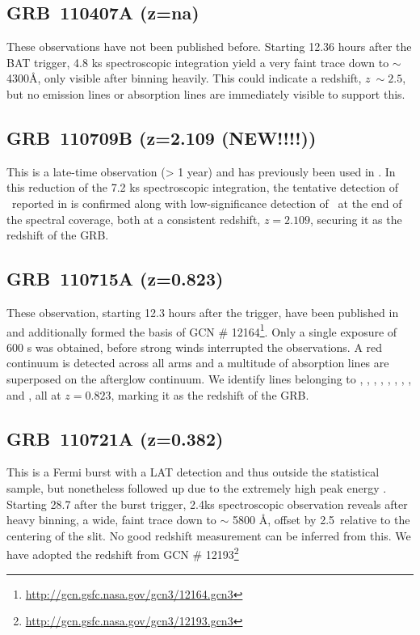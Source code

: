 \documentclass{aa}    %
\begin{document}
\subsection{GRB~110407A (z=na)} 

These observations have not been published before. Starting 12.36 hours after
the BAT trigger, 4.8 ks spectroscopic integration yield a very faint trace down
to $\sim$4300\AA, only visible after binning heavily. This could indicate a
redshift, $z ~\sim 2.5$, but no emission lines or absorption lines are
immediately visible to support this.

\subsection{GRB~110709B (z=2.109 (NEW!!!!))} 

This is a late-time observation (> 1 year) and has previously been used in
\citet{Perley2016a}. In this reduction of the 7.2 ks spectroscopic integration,
the tentative detection of \oiii~reported in \citet{Perley2016a} is confirmed
along with low-significance detection of \ha~at the end of the spectral
coverage, both at a consistent redshift, $z=2.109$, securing it as the redshift
of the GRB.


\subsection{GRB~110715A (z=0.823)}

These observation, starting 12.3 hours after the trigger, have been published in
\citet{Sanchez-Ramirez2017} and additionally formed the basis of GCN \#
12164\footnote{\url{http://gcn.gsfc.nasa.gov/gcn3/12164.gcn3}}. Only a single
exposure of 600 s was obtained, before strong winds interrupted the
observations. A red continuum is detected across all arms and a multitude of
absorption lines are superposed on the afterglow continuum. We identify lines
belonging to \alii, \aliii, \znii, \crii, \feii, \mgii, \mgi, \caii, and \caii,
all at  $z=0.823$, marking it as the redshift of the GRB.

\subsection{GRB~110721A (z=0.382)}

This is a Fermi burst with a LAT detection and thus outside the statistical
sample, but nonetheless followed up due to the extremely high peak energy
\citep{Axelsson2012}. Starting 28.7 after the burst trigger, 2.4ks spectroscopic
observation reveals after heavy binning, a wide, faint trace down to $\sim$ 5800
\AA, offset by 2.5\arcsec~relative to the centering of the slit. No good
redshift measurement can be inferred from this. We have adopted the redshift
from GCN \# 12193\footnote{\url{http://gcn.gsfc.nasa.gov/gcn3/12193.gcn3}}
\end{document}

